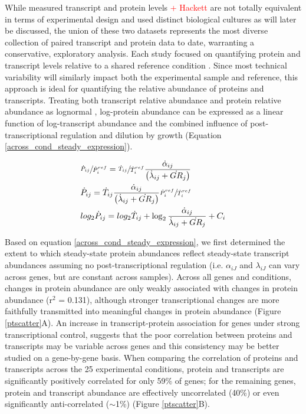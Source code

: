 While measured transcript and protein levels \cite{Brauer:2008jn}\textcolor{red}{+ Hackett} are not totally equivalent in terms of experimental design and used distinct biological cultures as will later be discussed, the union of these two datasets represents the most diverse collection of paired transcript and protein data to date, warranting a conservative, exploratory analysis.  Each study focused on quantifying protein and transcript levels relative to a shared reference condition \cite{Quackenbush:2002kl}.  Since most technical variability will similarly impact both the experimental sample and reference, this approach is ideal for quantifying the relative abundance of proteins and transcripts. Treating both transcript relative abundance and protein relative abundance as lognormal \cite{Quackenbush:2002kl, Cox:2008ir}, log-protein abundance can be expressed as a linear function of log-transcript abundance and the combined influence of post-transcriptional regulation and dilution by growth (Equation \ref{across_cond_steady_expression}).

\begin{align}
&\sfrac{\dot{P}_{ij}}{\dot{P}^{ref}_{i}} = \sfrac{\dot{T}_{ij}}{\dot{T}^{ref}_{i}}\frac{\dot{\alpha}_{ij}}{\left(\dot{\lambda}_{ij} + \dot{GR}_{j}\right)}\notag\\
&\dot{P}_{ij} = \dot{T}_{ij}\frac{\dot{\alpha}_{ij}}{\left(\dot{\lambda}_{ij} + \dot{GR}_{j}\right)}\sfrac{\dot{P}^{ref}_{i}}{\dot{T}^{ref}_{i}}\notag\\
&log_{2}\dot{P}_{ij} = log_{2}\dot{T}_{ij} + \log_{2}\frac{\dot{\alpha}_{ij}}{\dot{\lambda}_{ij} + \dot{GR}_{j}} + C_{i}\label{across_cond_steady_expression}
\end{align}

Based on equation \ref{across_cond_steady_expression}, we first determined the extent to which steady-state protein abundances reflect steady-state transcript abundances assuming no post-transcriptional regulation (i.e. $\alpha_{iJ}$ and $\lambda_{iJ}$ can vary across genes, but are constant across samples).  Across all genes and conditions, changes in protein abundance are only weakly associated with changes in protein abundance (r$^{2}$ = 0.131), although stronger transcriptional changes are more faithfully transmitted into meaningful changes in protein abundance (Figure \ref{ptscatter}A).  An increase in transcript-protein association for genes under strong transcriptional control, suggests that the poor correlation between proteins and transcripts may be variable across genes and this consistency may be better studied on a gene-by-gene basis.  When comparing the correlation of proteins and transcripts across the 25 experimental conditions, protein and transcripts are significantly positively correlated for only 59\% of genes; for the remaining genes, protein and transcript abundance are effectively uncorrelated (40\%) or even significantly anti-correlated ($\sim$1\%) (Figure \ref{ptscatter}B).


